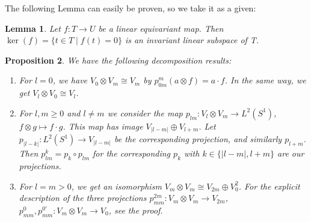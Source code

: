 \documentclass[12pt, a4paper]{article}
\theoremstyle{plain}
\newtheorem{pro}{Proposition}[section]
\newtheorem{lem}[pro]{Lemma}
\theoremstyle{definition}
\theoremstyle{remark}
\begin{document}
The following Lemma can easily be proven, so we take it as a given:

\begin{lem}\label{kernel invariant subspace}
Let $f: T \to U$ be a linear equivariant map. Then $\ker(f) = \{t \in T \mid f(t) = 0\}$ is an invariant linear subspace of T.
\end{lem}

\begin{pro}\label{decomposition_results}
We have the following decomposition results:
\begin{enumerate}
\item For $l=0$, we have $V_0 \otimes V_m \cong V_m$ by $p_{0m}^{m}(a \otimes f) = a \cdot f$. In the same way, we get $V_l \otimes V_0 \cong V_l$.
\item For $l, m \geq 0$ and $l \neq m$ we consider the map $p_{lm}: V_l \otimes V_m \to L^2(S^1)$, $f \otimes g \mapsto f \cdot g$. This map has image $V_{|l - m|} \oplus V_{l+m}$. Let $p_{|l-k|}: L^2(S^1) \to V_{|l-m|}$ be the corresponding projection, and similarly $p_{l+m}$. Then $p_{lm}^{k} = p_k \circ p_{lm}$ for the corresponding $p_k$ with $k \in \{|l-m|, l+m\}$ are our projections.
\item For $l = m > 0$, we get an isomorphism $V_m \otimes V_m \cong V_{2m} \oplus V_0^2$. For the explicit description of the three projections $p_{mm}^{2m}: V_m \otimes V_m \to V_{2m}$, $p_{mm}^{0}, p_{mm}^{0'}: V_{m} \otimes V_{m} \to V_0$, see the proof.
\end{enumerate}
\end{pro}
\end{document}
